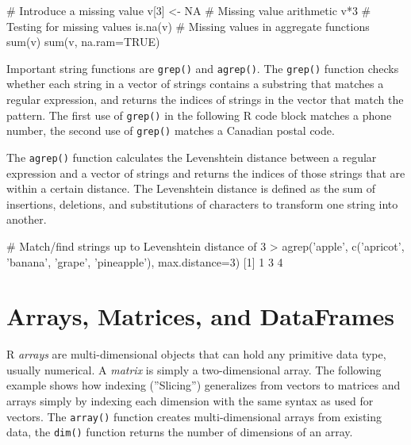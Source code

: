\begin{samepage}
\begin{Rcode}
# Introduce a missing value
v[3] <- NA
# Missing value arithmetic
v*3
# Testing for missing values
is.na(v)
# Missing values in aggregate functions
sum(v)
sum(v, na.ram=TRUE)
\end{Rcode}
\end{samepage}

Important string functions are \texttt{grep()} and \texttt{agrep()}. The \texttt{grep()} function checks whether each string in a vector of strings contains a substring that matches a regular expression, and returns the indices of strings in the vector that match the pattern. The first use of \texttt{grep()} in the following R code block matches a phone number, the second use of \texttt{grep()} matches a Canadian postal code.

\begin{samepage}
\end{samepage}

The \texttt{agrep()} function calculates the Levenshtein distance between a regular expression and a vector of strings and returns the indices of those strings that are within a certain distance. The Levenshtein distance is defined as the sum of insertions, deletions, and substitutions of characters to transform one string into another.

\begin{samepage}
\begin{Rcode}
# Match/find strings up to Levenshtein distance of 3
> agrep('apple', 
    c('apricot', 'banana', 'grape', 'pineapple'), 
    max.distance=3)
[1] 1 3 4
\end{Rcode}
\end{samepage}

\section{Arrays, Matrices, and DataFrames}

R \emph{arrays} are multi-dimensional objects that can hold any primitive data type, usually numerical. A \emph{matrix} is simply a two-dimensional array. The following example shows how indexing (''Slicing'') generalizes from vectors to matrices and arrays simply by indexing each dimension with the same syntax as used for vectors. The \texttt{array()} function creates multi-dimensional arrays from existing data, the \texttt{dim()} function returns the number of dimensions of an array.

